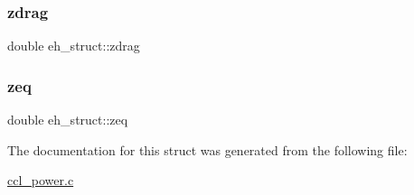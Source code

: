 \subsubsection{\texorpdfstring{zdrag}{zdrag}}
{\footnotesize\ttfamily double eh\+\_\+struct\+::zdrag}

\mbox{\label{structeh__struct_a115be04402be00203663cbf0cdeb6ccc}} 
\subsubsection{\texorpdfstring{zeq}{zeq}}
{\footnotesize\ttfamily double eh\+\_\+struct\+::zeq}



The documentation for this struct was generated from the following file\+:\begin{DoxyCompactItemize}
\item 
\mbox{\hyperlink{ccl__power_8c}{ccl\+\_\+power.\+c}}\end{DoxyCompactItemize}
